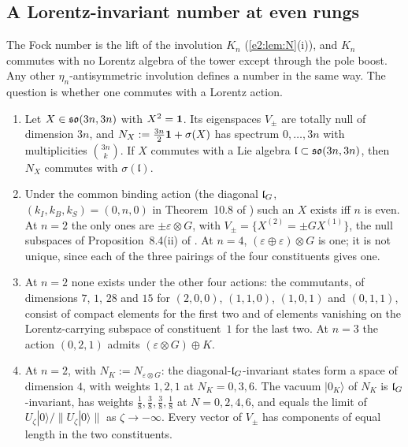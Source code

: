 \subsection{\texorpdfstring{A Lorentz-invariant number at even rungs}{A Lorentz-invariant number at even rungs}}
\label{e2:sec:invnumber}

The Fock number is the lift of the involution $K_n$ (\cref{e2:lem:N}(i)), and $K_n$ commutes with no Lorentz algebra of the tower except
through the pole boost. Any other $\eta_n$-antisymmetric involution defines a number in the same way. The question is whether one commutes
with a Lorentz action.

\begin{theorem}
\label{e2:thm:invnumber}
\begin{enumerate}[label=(\roman*),leftmargin=2.2em]
\item Let $X\in\mathfrak{so}(3n,3n)$ with $X^2=\mathbf 1$. Its eigenspaces $V_\pm$ are totally null of dimension $3n$, and $N_X:=\tfrac{3n}2\mathbf 1+\sigma(X)$ has spectrum
$0,\dots,3n$ with multiplicities $\binom{3n}k$. If $X$ commutes with a Lie algebra $\mathfrak l\subset\mathfrak{so}(3n,3n)$, then $N_X$ commutes with $\sigma(\mathfrak l)$.
\item Under the common binding action (the diagonal $\mathfrak l_G$, $(k_I,k_B,k_S)=(0,n,0)$ in Theorem~10.8 of \cite{ES17}) such an $X$ exists iff $n$ is even.
At $n=2$ the only ones are $\pm\varepsilon\otimes G$, with $V_\pm=\{X^{(2)}=\pm GX^{(1)}\}$, the null subspaces of Proposition~8.4(ii) of \cite{RE}. At
$n=4$, $(\varepsilon\oplus\varepsilon)\otimes G$ is one; it is not unique, since each of the three pairings of the four constituents gives one.
\item At $n=2$ none exists under the other four actions: the commutants, of dimensions $7$, $1$, $28$ and $15$ for $(2,0,0)$, $(1,1,0)$, $(1,0,1)$ and
$(0,1,1)$, consist of compact elements for the first two and of elements vanishing on the Lorentz-carrying subspace of constituent~$1$ for the
last two. At $n=3$ the action $(0,2,1)$ admits $(\varepsilon\otimes G)\oplus K$.
\item At $n=2$, with $N_K:=N_{\varepsilon\otimes G}$: the diagonal-$\mathfrak l_G$-invariant states form a space of dimension $4$, with weights $1,2,1$ at
$N_K=0,3,6$. The vacuum $|0_K\rangle$ of $N_K$ is $\mathfrak l_G$-invariant, has weights $\tfrac18,\tfrac38,\tfrac38,\tfrac18$ at $N=0,2,4,6$, and equals the
limit of $U_\zeta|0\rangle/\|U_\zeta|0\rangle\|$ as $\zeta\to-\infty$. Every vector of $V_\pm$ has components of equal length in the two constituents.
\end{enumerate}
\end{theorem}

